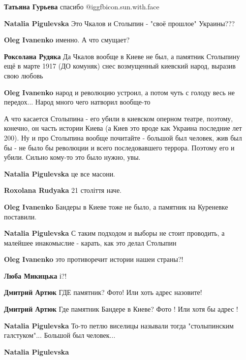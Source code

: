 \begin{itemize}
\begin{itemize}
\textbf{Татьяна Гурьева} спасибо  @igg{fbicon.sun.with.face} 

\textbf{Natalia Pigulevska} Это Чкалов и Столыпин - "своё прошлое" Украины???

\begin{itemize} %
\textbf{Oleg Ivanenko} именно. А что смущает?

\textbf{Роксолана Рудяка} Да Чкалов вообще в Киеве не был, а памятник Столыпину ещё в марте 1917 (ДО комуняк) снес возмущенный киевский народ, выразив свою любовь

\textbf{Oleg Ivanenko} народ и революцию устроил, а потом чуть с голоду весь не передох... Народ много чего натворил вообще-то


А что касается Столыпина - его убили в киевском оперном театре, поэтому,
конечно, он часть истории Киева (а Киев это вроде как Украина последние лет
200). Ну и про Столыпина вообще почитайте - большой был человек, жив был бы -
не было бы революции и всего последовавшего террора. Поэтому его и убили.
Сильно кому-то это было нужно, увы.

\textbf{Natalia Pigulevska} це все масони.

\textbf{Roxolana Rudyaka} 21 століття наче.

\textbf{Oleg Ivanenko} Бандеры в Киеве тоже не было, а памятник на Куреневке поставили.

\textbf{Natalia Pigulevska} С таким подходом и выборы не стоит проводить, а малейшее инакомыслие - карать, как это делал Столыпин

\textbf{Oleg Ivanenko} это противоречит истории нашеи страны?!

\textbf{Люба Микицька} і?!

\textbf{Дмитрий Артюк} ГДЕ памятник? Фото! Или хоть адрес назовите!

\textbf{Дмитрий Артюк} Где памятник Бандере в Киеве? Фото ! Или хотя бы адрес !

\textbf{Natalia Pigulevska} То-то петлю виселицы называли тогда "столыпинским галстуком"... Большой был человек...
\end{itemize} %

\textbf{Natalia Pigulevska} 


\end{itemize}
\end{itemize}
